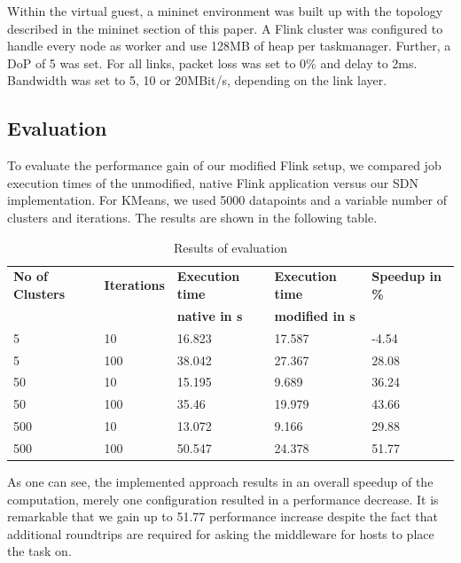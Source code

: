 Within the virtual guest, a mininet environment was built up with the topology described in the
mininet section of this paper. A Flink cluster was configured to handle every node as worker and use
128MB of heap per taskmanager. Further, a DoP of 5 was set. For all links, packet loss was set to 0\%
and delay to 2ms. Bandwidth was set to 5, 10 or 20MBit/s, depending on the link layer.

\subsection{Evaluation}
To evaluate the performance gain of our modified Flink setup, we compared job execution times of the
unmodified, native Flink application versus our SDN implementation. For KMeans, we used 5000
datapoints and a variable number of clusters and iterations. The results are shown in the following
table.

\begin{table}[h]
    \centering
    \begin{tabular}{| l | l | l | l | l | }
        \hline
        \textbf{No of Clusters} & \textbf{Iterations} & \textbf{Execution time}
            & \textbf{Execution time} & \textbf{Speedup in \%} \\
        & & \textbf{native in s} & \textbf{modified in s} & \\ \hline

        5 & 10 & 16.823 & 17.587 & -4.54 \\ \hline
        5 & 100 & 38.042 & 27.367 & 28.08 \\ \hline
        50 &10 &15.195 &9.689 &36.24 \\ \hline
        50 &100 &35.46 &19.979 &43.66 \\ \hline
        500 &10 &13.072 &9.166 &29.88 \\ \hline
        500 &100 &50.547 &24.378 &51.77 \\ \hline
    \end{tabular}
    \caption{Results of evaluation}
    \label{table:guest_properties}
\end{table}

As one can see, the implemented approach results in an overall speedup of the computation, merely
one configuration resulted in a performance decrease. It is remarkable that we gain up to 51.77%
performance increase despite the fact that additional roundtrips are required for asking the
middleware for hosts to place the task on.
